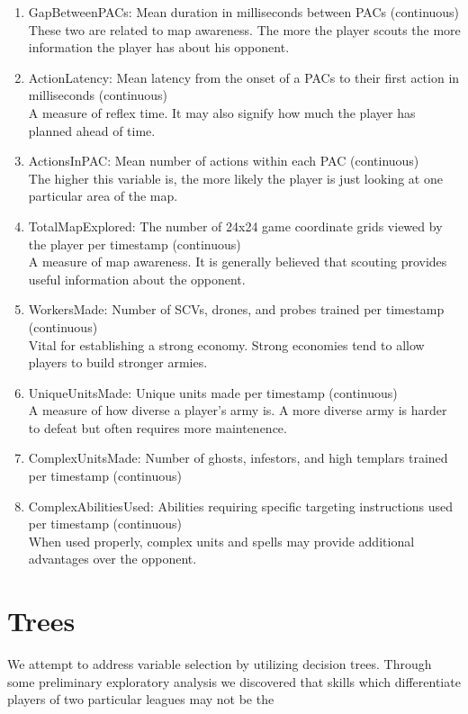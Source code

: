 \documentclass[letterpaper,10pt,english]{/usr/share/sphinx/texinputs/sphinxhowto}
\begin{document}
\begin{enumerate}[1.]
\item
  GapBetweenPACs: Mean duration in milliseconds between PACs
  (continuous)\\These two are related to map awareness. The more the
  player scouts the more information the player has about his opponent.
\item
  ActionLatency: Mean latency from the onset of a PACs to their first
  action in milliseconds (continuous)\\A measure of reflex time. It may
  also signify how much the player has planned ahead of time.
\item
  ActionsInPAC: Mean number of actions within each PAC (continuous)\\The
  higher this variable is, the more likely the player is just looking at
  one particular area of the map.
\item
  TotalMapExplored: The number of 24x24 game coordinate grids viewed by
  the player per timestamp (continuous)\\A measure of map awareness. It
  is generally believed that scouting provides useful information about
  the opponent.
\item
  WorkersMade: Number of SCVs, drones, and probes trained per timestamp
  (continuous)\\Vital for establishing a strong economy. Strong
  economies tend to allow players to build stronger armies.
\item
  UniqueUnitsMade: Unique units made per timestamp (continuous)\\A
  measure of how diverse a player's army is. A more diverse army is
  harder to defeat but often requires more maintenence.
\item
  ComplexUnitsMade: Number of ghosts, infestors, and high templars
  trained per timestamp (continuous)\\
\item
  ComplexAbilitiesUsed: Abilities requiring specific targeting
  instructions used per timestamp (continuous)\\When used properly,
  complex units and spells may provide additional advantages over the
  opponent.
\end{enumerate}\part{Trees}We attempt to address variable selection by utilizing decision trees.
Through some preliminary exploratory analysis we discovered that skills
which differentiate players of two particular leagues may not be the
\end{document}
